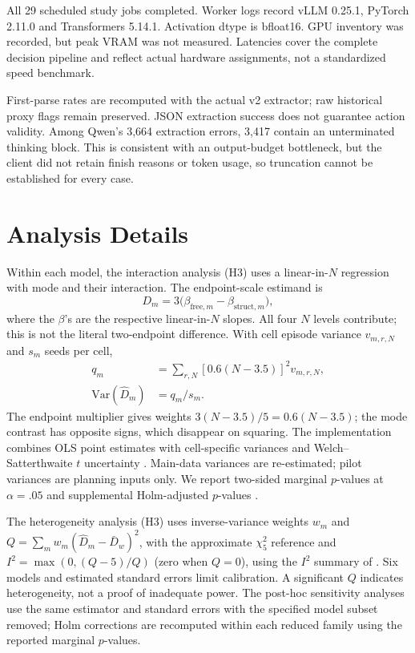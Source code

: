 \documentclass[11pt]{article}
\begin{document}
All 29 scheduled study jobs completed. Worker logs record vLLM 0.25.1, PyTorch 2.11.0 and Transformers 5.14.1. Activation dtype is bfloat16. GPU inventory was recorded, but peak VRAM was not measured. Latencies cover the complete decision pipeline and reflect actual hardware assignments, not a standardized speed benchmark.


First-parse rates are recomputed with the actual v2 extractor; raw historical proxy flags remain preserved. JSON extraction success does not guarantee action validity. Among Qwen's 3{,}664 extraction errors, 3{,}417 contain an unterminated thinking block. This is consistent with an output-budget bottleneck, but the client did not retain finish reasons or token usage, so truncation cannot be established for every case.

\section{Analysis Details}
\label{sec:analysis-details}
Within each model, the interaction analysis (H3) uses a linear-in-$N$ regression with mode and their interaction. The endpoint-scale estimand is
\begin{equation}
 D_m=3\bigl(\beta_{\mathrm{free},m}-\beta_{\mathrm{struct},m}\bigr),
\end{equation}
where the $\beta$'s are the respective linear-in-$N$ slopes. All four $N$ levels contribute; this is not the literal two-endpoint difference. With cell episode variance $v_{m,r,N}$ and $s_m$ seeds per cell,
\begin{equation}
 \begin{aligned}
 q_m&=\sum_{r,N}[0.6(N-3.5)]^2v_{m,r,N},\\
 \mathrm{Var}(\widehat D_m)&=q_m/s_m.
 \end{aligned}
\end{equation}
The endpoint multiplier gives weights $3(N-3.5)/5=0.6(N-3.5)$; the mode contrast has opposite signs, which disappear on squaring. The implementation combines OLS point estimates with cell-specific variances and Welch--Satterthwaite $t$ uncertainty \citep{welch1947variances}. Main-data variances are re-estimated; pilot variances are planning inputs only. We report two-sided marginal $p$-values at $\alpha=.05$ and supplemental Holm-adjusted $p$-values \citep{holm1979sequential}.

The heterogeneity analysis (H3) uses inverse-variance weights $w_m$ and $Q=\sum_m w_m(\widehat D_m-\bar D_w)^2$, with the approximate $\chi^2_5$ reference and $I^2=\max(0,(Q-5)/Q)$ (zero when $Q=0$), using the $I^2$ summary of \citet{higgins2002heterogeneity}. Six models and estimated standard errors limit calibration. A significant $Q$ indicates heterogeneity, not a proof of inadequate power. The post-hoc sensitivity analyses use the same estimator and standard errors with the specified model subset removed; Holm corrections are recomputed within each reduced family using the reported marginal $p$-values.
\end{document}
